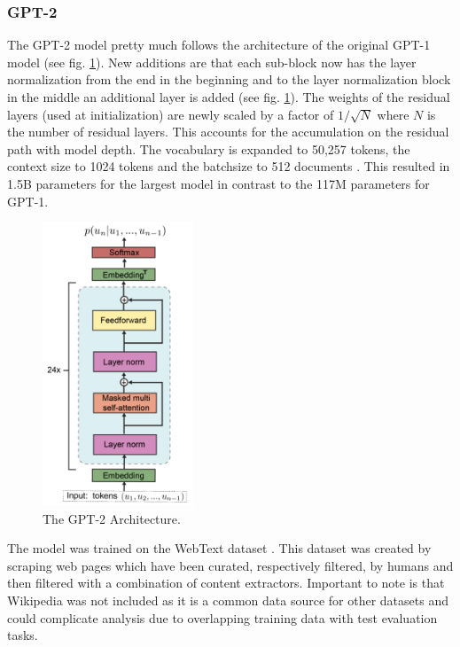 \subsubsection{GPT-2}
The GPT-2 \cite{gpt-2} model pretty much follows the architecture of the original GPT-1 model (see fig. \ref{fig:gpt2}). New additions are that each sub-block now has the layer normalization from the end in the beginning and to the layer normalization block in the middle an additional layer is added (see fig. \ref{fig:gpt2}). The weights of the residual layers (used at initialization) are newly scaled by a factor of $1/\sqrt{N}$ where $N$ is the number of residual layers. This accounts for the accumulation on the residual path with model depth. The vocabulary is expanded to 50,257 tokens, the context size to 1024 tokens and the batchsize to 512 documents \cite{gpt-2}. This resulted in 1.5B parameters for the largest model in contrast to the 117M parameters for GPT-1. 
\begin{figure}[H]
    \centering
    \includegraphics[width=0.4\textwidth]{figures/gpt2}
    \caption{The GPT-2 Architecture. \cite{heilbron2019tracking}}
    \label{fig:gpt2}
\end{figure}
The model was trained on the WebText dataset \cite{radford2019language}. This dataset was created by scraping web pages which have been curated, respectively filtered, by humans and then filtered with a combination of content extractors. Important to note is that Wikipedia was not included as it is a common data source for other datasets and could complicate analysis due to overlapping training data with test evaluation tasks. \cite{gpt-2}

